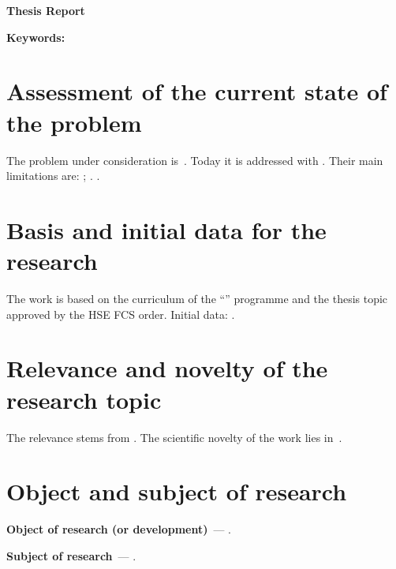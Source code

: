 \documentclass[12pt,a4paper]{extarticle}
\begin{document}
\sloppy



\begin{center}
  \textbf{\large Thesis Report}
\end{center}

\vspace{0.4em}

\noindent\textbf{Keywords:} 

\section{Assessment of the current state of the problem}
The problem under consideration is~. Today it is addressed with  \cite{example-en}. Their main limitations are: ; . .

\section{Basis and initial data for the research}
The work is based on the curriculum of the \enquote{\hseSpecialization} programme and the thesis topic approved by the HSE FCS order. Initial data: .

\section{Relevance and novelty of the research topic}
The relevance stems from . The scientific novelty of the work lies in~.

\section{Object and subject of research}
\textbf{Object of research (or development)}~--- .

\textbf{Subject of research}~--- .
\end{document}
